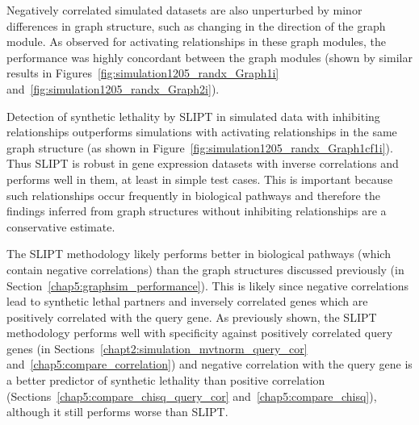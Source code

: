 Negatively correlated simulated datasets are also unperturbed by minor differences in graph structure, such as changing in the direction of the graph module. As observed for activating relationships in these graph modules, the performance was highly concordant between the graph modules (shown by similar results in Figures~\ref{fig:simulation1205_randx_Graph1i} and~\ref{fig:simulation1205_randx_Graph2i}).

Detection of synthetic lethality by \gls{SLIPT} in simulated data with inhibiting relationships outperforms simulations with activating relationships in the same graph structure (as shown in Figure~\ref{fig:simulation1205_randx_Graph1cf1i}). Thus \gls{SLIPT} is robust in gene expression datasets with inverse correlations and performs well in them, at least in simple test cases. This is important because such relationships occur frequently in biological pathways and therefore the findings inferred from graph structures without inhibiting relationships are a conservative estimate.

The \gls{SLIPT} methodology likely performs better in biological pathways (which contain negative correlations) than the graph structures discussed previously (in Section~\ref{chap5:graphsim_performance}). This is likely since negative correlations lead to synthetic lethal partners and inversely correlated genes which are positively correlated with the query gene. As previously shown, the \gls{SLIPT} methodology performs well with specificity against positively correlated query genes (in Sections~\ref{chapt2:simulation_mvtnorm_query_cor} and~\ref{chap5:compare_correlation}) and negative correlation with the query gene is a better predictor of synthetic lethality than positive correlation (Sections~\ref{chap5:compare_chisq_query_cor} and~\ref{chap5:compare_chisq}), although it still performs worse than \gls{SLIPT}.

